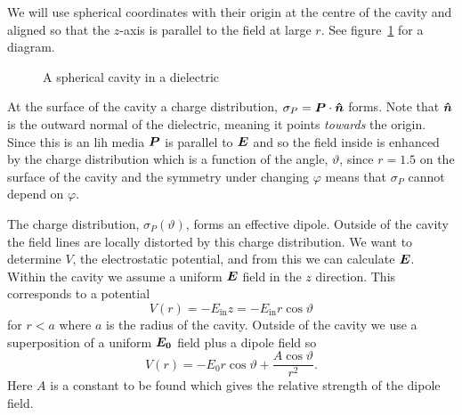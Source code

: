     We will use spherical coordinates with their origin at the centre of the cavity and aligned so that the \(z\)-axis is parallel to the field at large \(r\).
    See figure~\ref{fig:spherical cavity} for a diagram.
    \begin{figure}[ht]
        \centering
        \caption{A spherical cavity in a dielectric}
        \label{fig:spherical cavity}
    \end{figure}
    At the surface of the cavity a charge distribution, \(\sigma_P = \bm{P}\cdot\bm{\hat{n}}\) forms.
    Note that \(\bm{\hat{n}}\) is the outward normal of the dielectric, meaning it points \emph{towards} the origin.
    Since this is an \gls{lih} media \(\bm{P}\) is parallel to \(\bm{E}\) and so the field inside is enhanced by the charge distribution which is a function of the angle, \(\vartheta\), since \(r = 1.5\) on the surface of the cavity and the symmetry under changing \(\varphi\) means that \(\sigma_P\) cannot depend on \(\varphi\).
    
    The charge distribution, \(\sigma_P(\vartheta)\), forms an effective dipole.
    Outside of the cavity the field lines are locally distorted by this charge distribution.
    We want to determine \(V\), the electrostatic potential, and from this we can calculate \(\bm{E}\).
    Within the cavity we assume a uniform \(\bm{E}\) field in the \(z\) direction.
    This corresponds to a potential
    \[V(r) = -E_{\text{in}}z = -E_{\text{in}}r\cos\vartheta\]
    for \(r < a\) where \(a\) is the radius of the cavity.
    Outside of the cavity we use a superposition of a uniform \(\bm{E_0}\) field plus a dipole field so
    \[V(r) = -E_0r\cos\vartheta + \frac{A\cos\vartheta}{r^2}.\]
    Here \(A\) is a constant to be found which gives the relative strength of the dipole field.
    
